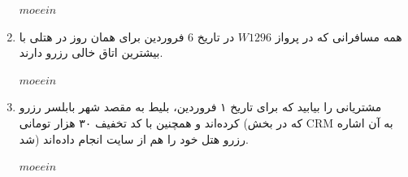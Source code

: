 \documentclass[12pt]{exam}
\begin{document}
\begin{enumerate}
\setLTR
$moeein$
\setRTL
	 
	 
	 
	
	\item
	 همه مسافرانی که در پرواز $W1296$ در تاریخ 6 فروردین برای همان روز در هتلی با بیشترین اتاق خالی رزرو دارند.
	
\setLTR
$moeein$
\setRTL
	
	
	
	
	\item
	 مشتریانی را بیابید که برای تاریخ ۱ فروردین، بلیط به مقصد شهر بابلسر رزرو کرده‌اند و همچنین \linebreak با کد تخفیف ۳۰ هزار تومانی (که در بخش CRM به‌ آن اشاره شد) رزرو هتل خود را هم از سایت انجام داده‌اند.
	 
\setLTR
$moeein$
\setRTL
	 
	 
	 
	
\end{enumerate}
\end{document}
